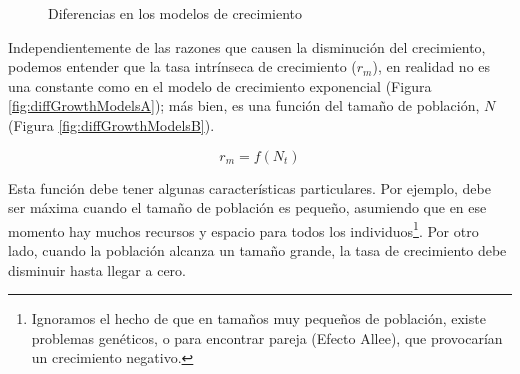 \documentclass[12pt,letterpaper,]{book}
\let\rmarkdownfootnote\footnote%
\def\footnote{\protect\rmarkdownfootnote}
\begin{document}
\begin{figure}[htb!]
        \centering
         \caption{Diferencias en los modelos de crecimiento}
        \label{fig:diffGrowthModels}
    \end{figure}

Independientemente de las razones que causen la disminución del
crecimiento, podemos entender que la tasa intrínseca de crecimiento
(\(r_m\)), en realidad no es una constante como en el modelo de
crecimiento exponencial (Figura \ref{fig:diffGrowthModelsA}); más bien,
es una función del tamaño de población, \(N\) (Figura
\ref{fig:diffGrowthModelsB}).

\[
r_m = f \left( N_t \right)
\]

Esta función debe tener algunas características particulares. Por
ejemplo, debe ser máxima cuando el tamaño de población es pequeño,
asumiendo que en ese momento hay muchos recursos y espacio para todos
los
individuos\footnote{Ignoramos el hecho de que en tamaños muy pequeños de población, existe problemas genéticos, o para encontrar pareja (Efecto Allee), que provocarían un crecimiento negativo.}.
Por otro lado, cuando la población alcanza un tamaño grande, la tasa de
crecimiento debe disminuir hasta llegar a cero.
\end{document}

